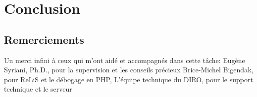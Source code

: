 \documentclass[12pt,titlepage]{article}
\let\oldsection\section
\renewcommand\section{\clearpage\oldsection}
\begin{document}
\section{Conclusion}
\subsection{Remerciements}
Un merci infini à ceux qui m'ont aidé et accompagnés dans cette tâche: \newline
Eugène Syriani, Ph.D., pour la supervision et les conseils précieux\newline
Brice-Michel Bigendak, pour ReLiS et le débogage en PHP,
L'équipe technique du DIRO, pour le support technique et le serveur
{}

\end{document}

